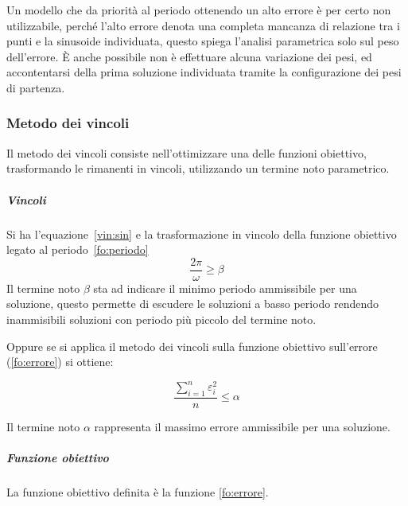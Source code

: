 \documentclass[a4paper,12pt]{report}
\begin{document}
Un modello che da priorità al periodo ottenendo un alto errore è per certo non utilizzabile, perché l'alto errore denota una completa mancanza di relazione tra i punti e la sinusoide individuata, questo spiega l'analisi parametrica solo sul peso dell'errore. È anche possibile non è effettuare alcuna variazione dei pesi, ed accontentarsi della prima soluzione individuata tramite la configurazione dei pesi di partenza.

\subsubsection{Metodo dei vincoli}
Il metodo dei vincoli consiste nell'ottimizzare una delle funzioni obiettivo, trasformando le rimanenti in vincoli, utilizzando un termine noto parametrico.

\subparagraph{Vincoli} Si ha l'equazione~\eqref{vin:sin} e la trasformazione in vincolo della funzione obiettivo legato al periodo~\eqref{fo:periodo}
\begin{equation}
\label{vin:periodo}
\frac{2\pi}{\omega} \ge \beta
\end{equation}
Il termine noto $ \beta $ sta ad indicare il minimo periodo ammissibile per una soluzione, questo permette di escudere le soluzioni a basso periodo rendendo inammisibili soluzioni con periodo più piccolo del termine noto.

Oppure se si applica il metodo dei vincoli sulla funzione obiettivo sull'errore (\ref{fo:errore}) si ottiene:

\begin{equation}
\label{vin:errore}
\frac{\sum_{i=1}^n \varepsilon_i^2}{n} \le \alpha
\end{equation}

Il termine noto $ \alpha $ rappresenta il massimo errore ammissibile per una soluzione.

\subparagraph{Funzione obiettivo}
La funzione obiettivo definita è la funzione \eqref{fo:errore}.
\end{document}
